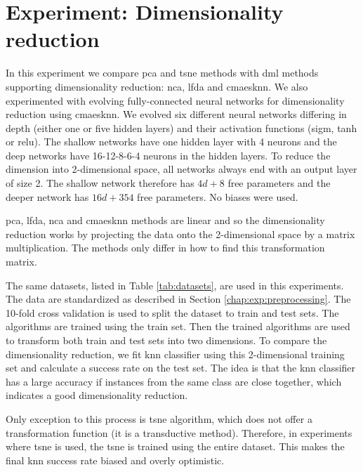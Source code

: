 \documentclass[12pt,a4paper]{report}
\begin{document}


\section{Experiment: Dimensionality reduction} \label{chap:exp:dimred}


In this experiment we compare \ac{pca} and \ac{tsne} methods with \ac{dml} methods supporting dimensionality reduction: \ac{nca}, \ac{lfda} and \ac{cmaesknn}. We also experimented with evolving fully-connected neural networks for dimensionality reduction using \ac{cmaesknn}. We evolved six different neural networks differing in depth (either one or five hidden layers) and their activation functions (\ac{sigm}, \ac{tanh} or \ac{relu}). The shallow networks have one hidden layer with 4 neurons and the deep networks have 16-12-8-6-4 neurons in the hidden layers. To reduce the dimension into 2-dimensional space, all networks always end with an output layer of size 2. The shallow network therefore has $4d+8$ free parameters and the deeper network has $16d+354$ free parameters. No biases were used.

\ac{pca}, \ac{lfda}, \ac{nca} and \ac{cmaesknn} methods are linear and so the dimensionality reduction works by projecting the data onto the 2-dimensional space by a matrix multiplication. The methods only differ in how to find this transformation matrix.

The same datasets, listed in Table \ref{tab:datasets}, are used in this experiments. The data are standardized as described in Section \ref{chap:exp:preprocessing}. The 10-fold cross validation is used to split the dataset to train and test sets. The algorithms are trained using the train set. Then the trained algorithms are used to transform both train and test sets into two dimensions. To compare the dimensionality reduction, we fit \ac{knn} classifier using this 2-dimensional training set and calculate a success rate on the test set. The idea is that the \ac{knn} classifier has a large accuracy if instances from the same class are close together, which indicates a good dimensionality reduction. 

Only exception to this process is \ac{tsne} algorithm, which does not offer a transformation function (it is a transductive method). Therefore, in experiments where \ac{tsne} is used, the \ac{tsne} is trained using the entire dataset. This makes the final \ac{knn} success rate biased and overly optimistic. %
\end{document}

